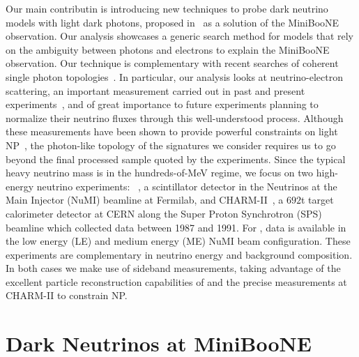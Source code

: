 Our main contributin is introducing new techniques to probe dark neutrino models with light dark photons, proposed in~\cite{Bertuzzo:2018itn,Bertuzzo:2018ftf} as a solution of the MiniBooNE observation. Our analysis showcases a generic search method for models that rely on the ambiguity between photons and electrons to explain the MiniBooNE observation. Our technique is complementary with recent searches of coherent single photon topologies~\cite{Abe:2019cer}. In particular, our analysis looks at neutrino-electron scattering, an important measurement carried out in past and present experiments~\cite{Auerbach:2001wg, Deniz:2009mu,Bellini:2011rx}, and of great importance to future experiments planning to normalize their neutrino fluxes through this well-understood process. Although these measurements have been shown to provide powerful constraints on light NP~\cite{Pospelov:2017kep,Lindner:2018kjo,Magill:2018tbb}, the photon-like topology of the signatures we consider requires us to go beyond the final processed sample quoted by the experiments. 
Since the typical heavy neutrino mass is in the hundreds-of-MeV regime, we focus on two high-energy neutrino experiments: \minerva~\cite{Park:2013dax,Valencia:2019mkf,Park:2015eqa,Valencia-Rodriguez:2016vkf}, a scintillator detector in the Neutrinos at the Main Injector (NuMI) beamline at Fermilab, and CHARM-II~\cite{DeWinter:1989zg,Geiregat:1992zv,Vilain:1994qy}, a $692$t target calorimeter detector at CERN along the Super Proton Synchrotron (SPS) beamline which collected data between 1987 and 1991. For \minerva, data is available in the low energy (LE) and medium energy (ME) NuMI beam configuration. These experiments are complementary in neutrino energy and background composition. In both cases we make use of sideband measurements, taking advantage of the excellent particle reconstruction capabilities of \minerva and the precise measurements at CHARM-II to constrain NP.

\section{Dark Neutrinos at MiniBooNE}

